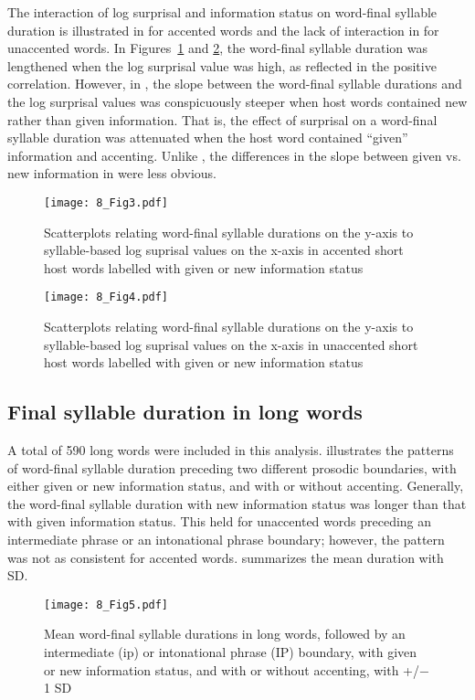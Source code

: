\documentclass[output=paper,colorlinks,citecolor=brown]{langscibook}
\begin{document}
The interaction of log surprisal and information status on word-final syllable duration is illustrated in  for accented words and the lack of interaction in  for unaccented words. In Figures~\ref{fig3} and \ref{fig4}, the word-final syllable duration was lengthened when the log surprisal value was high, as reflected in the positive correlation. However, in , the slope between the word-final syllable durations and the log surprisal values was conspicuously steeper when host words contained new rather than given information. That is, the effect of surprisal on a word-final syllable duration was attenuated when the host word contained “given” information and accenting. Unlike , the differences in the slope between given vs. new information in  were less obvious.

\begin{figure}
\texttt{[image: 8\_Fig3.pdf]}
\caption{Scatterplots relating word-final syllable durations on the y-axis to syllable-based log suprisal values on the x-axis in accented short host words labelled with given or new information status}
\label{fig3}
\end{figure}

\begin{figure}
\texttt{[image: 8\_Fig4.pdf]}
\caption{Scatterplots relating word-final syllable durations on the y-axis to syllable-based log suprisal values on the x-axis in unaccented short host words labelled with given or new information status}
\label{fig4}
\end{figure}

 \subsection{Final syllable duration in long words}
A total of 590 long words were included in this analysis.  illustrates the patterns of word-final syllable duration preceding two different prosodic boundaries, with either given or new information status, and with or without accenting. Generally, the word-final syllable duration with new information status was longer than that with given information status. This held for unaccented words preceding an intermediate phrase or an intonational phrase boundary; however, the pattern was not as consistent for accented words.  summarizes the mean duration with SD.

\begin{figure}
\texttt{[image: 8\_Fig5.pdf]}
\caption{Mean word-final syllable durations in long words, followed by an intermediate (ip) or intonational phrase (IP) boundary, with given or new information status, and with or without accenting, with +/− 1 SD}
\label{fig5}
\end{figure}
\end{document}
